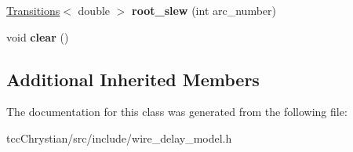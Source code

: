 \begin{DoxyCompactItemize}
\item 
\hypertarget{classLumpedCapacitanceWireDelayModel_a65e4141bbf97638c2334f71dfbf0ccfd}{\hyperlink{classTransitions}{Transitions}$<$ double $>$ {\bfseries root\-\_\-slew} (int arc\-\_\-number)}\label{classLumpedCapacitanceWireDelayModel_a65e4141bbf97638c2334f71dfbf0ccfd}

\item 
\hypertarget{classLumpedCapacitanceWireDelayModel_acca0415a76729b616be06543262ef441}{void {\bfseries clear} ()}\label{classLumpedCapacitanceWireDelayModel_acca0415a76729b616be06543262ef441}

\end{DoxyCompactItemize}
\subsection*{Additional Inherited Members}


The documentation for this class was generated from the following file\-:\begin{DoxyCompactItemize}
\item 
tcc\-Chrystian/src/include/wire\-\_\-delay\-\_\-model.\-h\end{DoxyCompactItemize}
